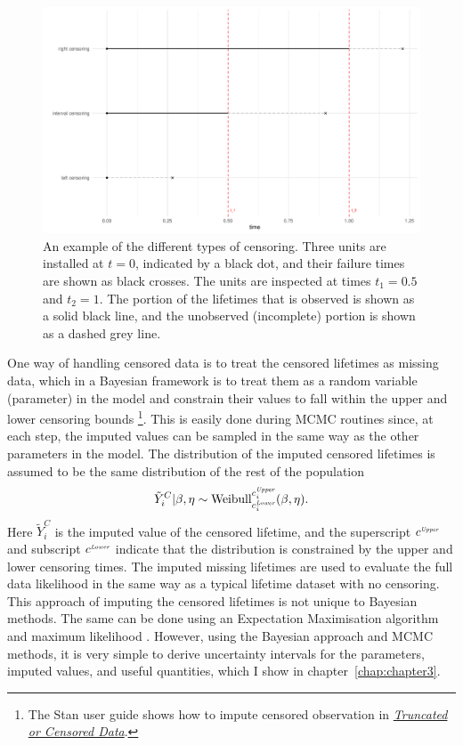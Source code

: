 \begin{figure}[h]
    \centering
    \includegraphics[width=1\textwidth]{./figures/censoring_example.pdf}
    \caption{An example of the different types of censoring. Three units are installed at $t = 0$, indicated by a black dot, and their failure times are shown as black crosses. The units are inspected at times $t_1 = 0.5$ and $t_2 = 1$. The portion of the lifetimes that is observed is shown as a solid black line, and the unobserved (incomplete) portion is shown as a dashed grey line.}
    \label{fig:cense_examp}
\end{figure}

One way of handling censored data is to treat the censored lifetimes as missing data, which in a Bayesian framework is to treat them as a random variable (parameter) in the model \citep[p.211]{reich2019} and constrain their values to fall within the upper and lower censoring bounds \citep{stan_user_guide2024}\footnote{The Stan user guide shows how to impute censored observation in \href{https://mc-stan.org/docs/stan-users-guide/truncation-censoring.html}{\textit{Truncated or Censored Data}}.}. This is easily done during MCMC routines since, at each step, the imputed values can be sampled in the same way as the other parameters in the model. The distribution of the imputed censored lifetimes is assumed to be the same distribution of the rest of the population
\begin{equation}
    \label{eq:impute-cens}
    \tilde{Y}^C_i|\beta, \eta \sim \hbox{Weibull}^{c^{\textit{\tiny{Upper}}}_i}_{c^{\textit{\tiny{Lower}}}_i}(\beta, \eta).
\end{equation}
Here $\tilde{Y}^C_i$ is the imputed value of the censored lifetime, and the superscript $c^{\textit{\tiny{Upper}}}$ and subscript $c^{\textit{\tiny{Lower}}}$ indicate that the distribution is constrained by the upper and lower censoring times. The imputed missing lifetimes are used to evaluate the full data likelihood in the same way as a typical lifetime dataset with no censoring. This approach of imputing the censored lifetimes is not unique to Bayesian methods. The same can be done using an Expectation Maximisation algorithm and maximum likelihood \citep{mitra2013}. However, using the Bayesian approach and MCMC methods, it is very simple to derive uncertainty intervals for the parameters, imputed values, and useful quantities, which I show in chapter~\ref{chap:chapter3}.

